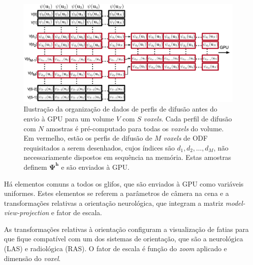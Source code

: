 \documentclass[
    12pt,                %
    oneside,            %
    a4paper,            %
    english,            %
    french,                %
    spanish,            %
    brazil                %
    ]{abntex2}
\begin{document}
\begin{figure}[ht]

    \centering
    \includegraphics[width=1.0\linewidth, angle=0]{figs/Esquema_Glifo/organizacao2GPU.png}
    \caption{Ilustração da organização de dados de perfis de difusão antes do envio à GPU para um volume $V$ com $S$ \textit{voxels}. Cada perfil de difusão com $N$ amostras é pré-computado para todas os \textit{voxels} do volume. Em vermelho, estão os perfis de difusão de $M$ \textit{voxels} de ODF requisitados a serem desenhados, cujos índices são $d_1, d_2, \dots, d_M$, não necessariamente dispostos em sequência na memória. Estas amostras definem $\mathbf{\Psi^h}$ e são enviados à GPU.}
    \label{fig::organizacao2GPU}
   \hspace{1pt}
\end{figure}







Há elementos comuns a todos os glifos, que são enviados à GPU como variáveis uniformes. Estes elementos se referem a parâmetros de câmera na cena e a transformações relativas a orientação neurológica, que integram a matriz \textit{model-view-projection} e fator de escala.

As transformações relativas à orientação configuram a visualização de fatias para que fique compatível com um dos sistemas de orientação, que são a neurológica (LAS) e radiológica (RAS). O fator de escala é função do \textit{zoom} aplicado e dimensão do \textit{voxel}.





\end{document}
